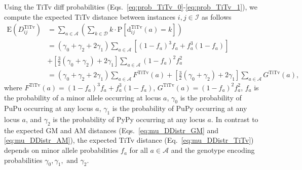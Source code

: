 \documentclass[10pt,letterpaper]{article}
\begin{document}
Using the TiTv diff probabilities (Eqs.~\ref{eq:prob_TiTv_0}-\ref{eq:prob_TiTv_1}), we compute the expected TiTv distance between instances $i,j \in \mathcal{I}$ as follows
%
\begin{equation}\label{eq:mu_DDistr_TiTv}
\begin{aligned}
\text{E}\left(D^\text{TiTv}_{ij}\right) &= \sum_{a \in \mathcal{A}} \left(\sum_{k \in \mathcal{D}} k \cdot \text{P}\left[\text{d}^\text{TiTv}_{ij}(a) = k\right]\right) \\
&= (\gamma_0 + \gamma_2 + 2\gamma_1) \sum_{a \in \mathcal{A}} \left[(1 - f_a)^3 f_a + f^3_a (1 - f_a)\right] \\
&+ \left[\frac{3}{2}(\gamma_0 + \gamma_2) + 2\gamma_1\right] \sum_{a \in \mathcal{A}} (1 - f_a)^2 f^2_a \\
&= (\gamma_0 + \gamma_2 + 2\gamma_1) \sum_{a \in \mathcal{A}} F^\text{TiTv}(a) + \left[\frac{3}{2}(\gamma_0 + \gamma_2) + 2\gamma_1\right] \sum_{a \in \mathcal{A}} G^\text{TiTv}(a),
\end{aligned}
\end{equation}
%
where $F^\text{TiTv}(a) = (1 - f_a)^3 f_a + f^3_a (1 - f_a)$, $G^\text{TiTv}(a) = (1 - f_a)^2 f^2_a$, $f_a$ is the probability of a minor allele occurring at locus $a$, $\gamma_0$ is the probability of PuPu occurring at any locus $a$, $\gamma_1$ is the probability of PuPy occurring at any locus $a$, and $\gamma_2$ is the probability of PyPy occurring at any locus $a$. In contrast to the expected GM and AM distances (Eqs.~\ref{eq:mu_DDistr_GM} and \ref{eq:mu_DDistr_AM}), the expected TiTv distance (Eq.~\ref{eq:mu_DDistr_TiTv}) depends on minor allele probabilities $f_a$ for all $a \in \mathcal{A}$ and the genotype encoding probabilities $\gamma_0, \gamma_1, \text{ and } \gamma_2$. 
\end{document}
